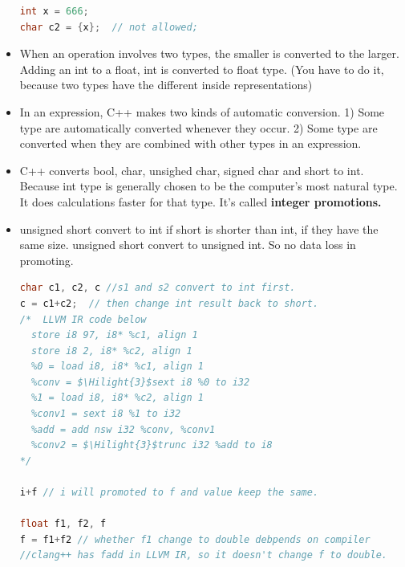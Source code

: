 \documentclass[a4paper,12pt,twoside]{book}
\newcommand{\Hilight}[1]{\makebox[0pt][l]{\color{yellow}\rule[-3pt]{#1em}{11pt}}}
\begin{document}
\begin{itemize}
\begin{lstlisting}[frame=single, language=c++]
int x = 666;
char c2 = {x};  // not allowed;
\end{lstlisting}


\item When an operation involves two types, the smaller is converted to the larger. Adding an int to a float, int is converted to float type. (You have to do it, because two types have the different inside representations)

\item In an expression, C++ makes two kinds of automatic conversion. 1) Some type are automatically converted whenever they occur. 2) Some type are converted when they are combined with other types in an expression.

\item C++ converts bool, char, unsighed char, signed char and short to int. Because int type is generally chosen to be the computer's most natural type. It does calculations faster for that type. It's called \textbf{integer promotions.}

\item unsigned short convert to int if short is shorter than int, if they have the same size. unsigned short convert to unsigned int.  So no data loss in promoting.
\begin{lstlisting}[frame=single, language=c++, mathescape=true]
char c1, c2, c //s1 and s2 convert to int first.
c = c1+c2;  // then change int result back to short.
/*  LLVM IR code below
  store i8 97, i8* %c1, align 1
  store i8 2, i8* %c2, align 1
  %0 = load i8, i8* %c1, align 1
  %conv = $\Hilight{3}$sext i8 %0 to i32
  %1 = load i8, i8* %c2, align 1
  %conv1 = sext i8 %1 to i32
  %add = add nsw i32 %conv, %conv1
  %conv2 = $\Hilight{3}$trunc i32 %add to i8
*/

i+f // i will promoted to f and value keep the same.

float f1, f2, f
f = f1+f2 // whether f1 change to double debpends on compiler
//clang++ has fadd in LLVM IR, so it doesn't change f to double.
\end{lstlisting}
\end{itemize}
\end{document}
